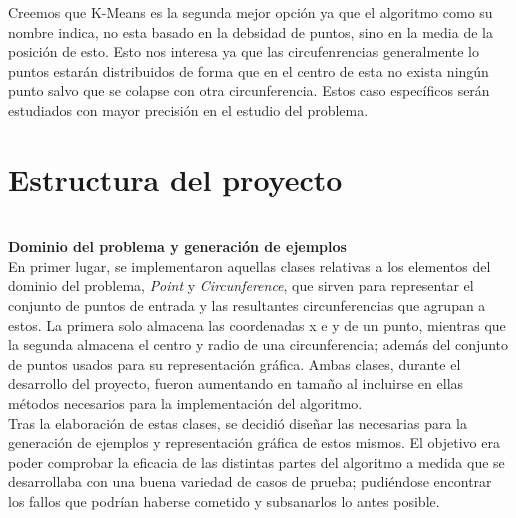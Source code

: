 \documentclass[conference,a4paper]{IEEEtran}
\begin{document}
Creemos que K-Means es la segunda mejor opción ya que el algoritmo como su nombre indica, no esta basado en la debsidad de puntos, sino en la media de la posición de esto. Esto nos interesa ya que las circufenrencias generalmente lo puntos estarán distribuidos de forma que en el centro de esta no exista ningún punto salvo que se colapse con otra circunferencia. Estos caso específicos serán estudiados con mayor precisión en el estudio del problema.\\

\clearpage


\section{Estructura del proyecto}

\textbf{\\Dominio del problema y generación de ejemplos}\\

En primer lugar, se implementaron aquellas clases relativas a los elementos del dominio del problema, \textit{Point} y \textit{Circunference}, que sirven para representar el conjunto de puntos de entrada y las resultantes circunferencias que agrupan a estos.
La primera solo almacena las coordenadas x e y de un punto, mientras que la segunda almacena el centro y radio de una circunferencia; además del conjunto de puntos usados para su representación gráfica. Ambas clases, durante el desarrollo del proyecto, fueron aumentando en tamaño al incluirse en ellas métodos necesarios para la implementación del algoritmo.\\

Tras la elaboración de estas clases, se decidió diseñar las necesarias para la generación de ejemplos y representación gráfica de estos mismos. El objetivo era poder comprobar la eficacia de las distintas partes del algoritmo a medida que se desarrollaba con una buena variedad de casos de prueba; pudiéndose encontrar los fallos que podrían haberse cometido y subsanarlos lo antes posible.\\
\end{document}
